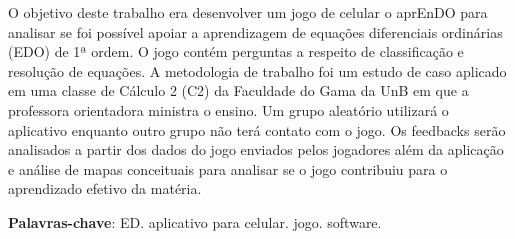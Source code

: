 \begin{resumo}
O objetivo deste trabalho era desenvolver um jogo de celular o aprEnDO para analisar se
 foi possível apoiar a aprendizagem de equações diferenciais ordinárias (EDO) de 1ª ordem.
 O jogo contém perguntas a respeito de classificação e resolução de equações. A metodologia
 de trabalho foi um estudo de caso aplicado em  uma classe de Cálculo 2 (C2) da Faculdade 
 do Gama da UnB em que a professora orientadora ministra o ensino. Um grupo aleatório 
 utilizará o aplicativo enquanto outro grupo não terá contato com o jogo. Os feedbacks 
 serão analisados a partir dos dados do jogo enviados pelos jogadores além da aplicação e 
 análise de mapas conceituais para analisar se o jogo contribuiu para o aprendizado efetivo 
 da matéria.
	
\begin{comment}
 Com a qualidade de ensino de matemática baixa e contra os métodos muito
 tradicionais de ensino nas salas de aula, resolveu-se desenvolver um 
 aplicativo para celular (iOS e Android) que seja um jogo para o suporte de 
 ensino de equações diferenciais (ED). Será realizada uma pesquisa descritiva
 para o levantamento bibliográfico das características que deverão estar presentes
 no software para dar auxílio a alunos com TDAH junto de técnicas de gamificação 
 para tentar deixar o aprendizado mais prazeroso.
\end{comment}
  
 \begin{comment}
 O resumo deve ressaltar o objetivo, o método, os resultados e as conclusões 
 do documento. A ordem e a extensão
 destes itens dependem do tipo de resumo (informativo ou indicativo) e do
 tratamento que cada item recebe no documento original. O resumo deve ser
 precedido da referência do documento, com exceção do resumo inserido no
 próprio documento. (\ldots) As palavras-chave devem figurar logo abaixo do
 resumo, antecedidas da expressão Palavras-chave:, separadas entre si por
 ponto e finalizadas também por ponto. O texto pode conter no mínimo 150 e 
 no máximo 500 palavras, é aconselhável que sejam utilizadas 200 palavras. 
 E não se separa o texto do resumo em parágrafos.
 \end{comment}

 \vspace{\onelineskip}
    
 \noindent
 \textbf{Palavras-chave}: ED. aplicativo para celular. jogo. software.
\end{resumo}
